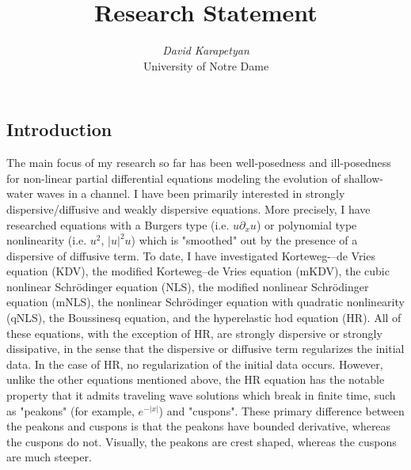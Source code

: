 \documentclass[12pt,reqno]{amsart}
\newcommand{\p}{\partial}
\begin{document}
\title{Research Statement} 
\author{{\it David Karapetyan}\\
    \/ University of Notre Dame}
\maketitle


\parindent0in
\parskip0.1in
%
%
%
\setcounter{section}{0}
%
%
%
%
%
%
%
%
\subsection{Introduction} 
\label{ssec:cur-res}
The main focus of my research so far has been well-posedness and ill-posedness
for non-linear partial differential equations modeling the evolution of
shallow-water waves in a channel. I have been primarily interested in
strongly dispersive/diffusive and weakly dispersive equations. More precisely, I have researched
equations with a Burgers type (i.e. $u\p_x u$) or polynomial type nonlinearity
(i.e. $u^{2}$, $| u |^{2} u$) which is "smoothed" out by
the presence of a dispersive of diffusive term. To date, I have investigated
Korteweg-–de Vries equation (KDV), the modified Korteweg--de Vries equation
(mKDV), the cubic nonlinear Schr\"odinger equation (NLS), the modified nonlinear
Schr\"odinger equation (mNLS), the nonlinear Schr\"odinger equation with quadratic
nonlinearity (qNLS), the Boussinesq equation, and the hyperelastic hod equation
(HR). All of these equations, with the exception of HR, are strongly dispersive
or strongly dissipative, in the sense that the dispersive or diffusive term
regularizes the initial data. In the case of HR, no regularization of the
initial data occurs. However, unlike the other equations mentioned above, the HR
equation has the notable property that it admits traveling wave solutions which
break in finite time, such as "peakons" (for example, $e^{-| x |}$) and
"cuspons". These primary difference between the peakons and cuspons is that the
peakons have bounded derivative, whereas the cuspons do not. Visually, the peakons are crest shaped, whereas the cuspons are much steeper.
%
%
\end{document}
